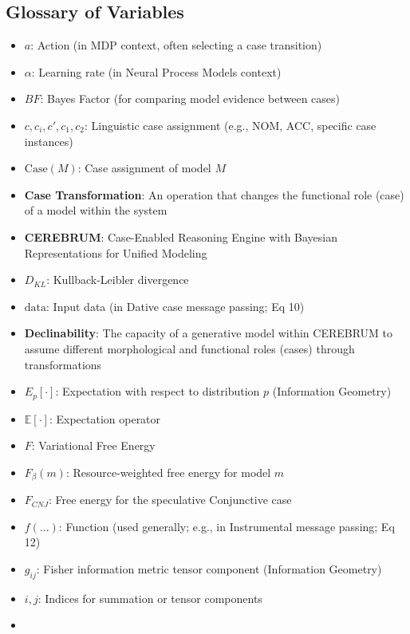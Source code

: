 \documentclass[
  11pt,
  letterpaper,
]{article}
\providecommand{\tightlist}{%
  \setlength{\itemsep}{0pt}\setlength{\parskip}{0pt}}
\begin{document}
\hypertarget{glossary-of-variables}{%
\subsection{Glossary of Variables}\label{glossary-of-variables}}

\begin{itemize}
\tightlist
\item
  \(a\): Action (in MDP context, often selecting a case transition)
\item
  \(\alpha\): Learning rate (in Neural Process Models context)
\item
  \(BF\): Bayes Factor (for comparing model evidence between cases)
\item
  \(c, c_i, c', c_1, c_2\): Linguistic case assignment (e.g., NOM, ACC,
  specific case instances)
\item
  \(\text{Case}(M)\): Case assignment of model \(M\)
\item
  \textbf{Case Transformation}: An operation that changes the functional
  role (case) of a model within the system
\item
  \textbf{CEREBRUM}: Case-Enabled Reasoning Engine with Bayesian
  Representations for Unified Modeling
\item
  \(D_{KL}\): Kullback-Leibler divergence
\item
  \(\text{data}\): Input data (in Dative case message passing; Eq 10)
\item
  \textbf{Declinability}: The capacity of a generative model within
  CEREBRUM to assume different morphological and functional roles
  (cases) through transformations
\item
  \(E_p[\cdot]\): Expectation with respect to distribution \(p\)
  (Information Geometry)
\item
  \(\mathbb{E}[\cdot]\): Expectation operator
\item
  \(F\): Variational Free Energy
\item
  \(F_{\beta}(m)\): Resource-weighted free energy for model \(m\)
\item
  \(F_{CNJ}\): Free energy for the speculative Conjunctive case
\item
  \(f(...)\): Function (used generally; e.g., in Instrumental message
  passing; Eq 12)
\item
  \(g_{ij}\): Fisher information metric tensor component (Information
  Geometry)
\item
  \(i, j\): Indices for summation or tensor components
\item

\end{itemize}
\end{document}
